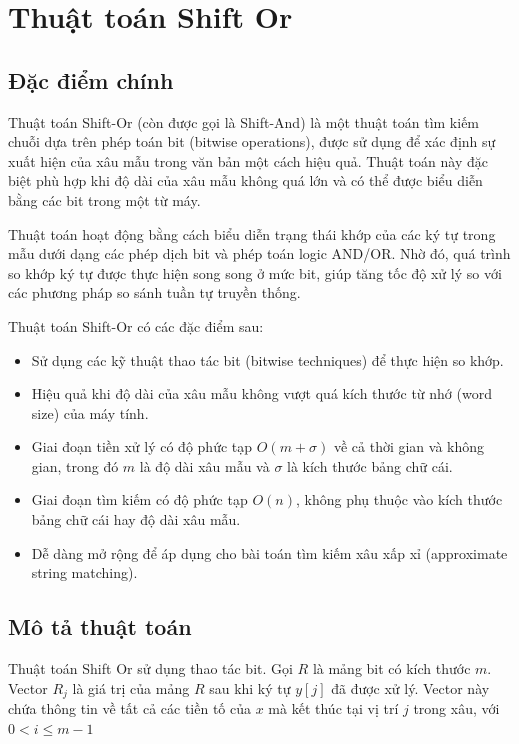 \section{Thuật toán Shift Or}

\subsection{Đặc điểm chính}

Thuật toán Shift-Or (còn được gọi là Shift-And) là một thuật toán tìm kiếm chuỗi dựa trên phép toán bit (bitwise operations), được sử dụng để xác định sự xuất hiện của xâu mẫu trong văn bản một cách hiệu quả. Thuật toán này đặc biệt phù hợp khi độ dài của xâu mẫu không quá lớn và có thể được biểu diễn bằng các bit trong một từ máy.

Thuật toán hoạt động bằng cách biểu diễn trạng thái khớp của các ký tự trong mẫu dưới dạng các phép dịch bit và phép toán logic AND/OR. Nhờ đó, quá trình so khớp ký tự được thực hiện song song ở mức bit, giúp tăng tốc độ xử lý so với các phương pháp so sánh tuần tự truyền thống.

Thuật toán Shift-Or có các đặc điểm sau:

\begin{itemize}
    \item Sử dụng các kỹ thuật thao tác bit (bitwise techniques) để thực hiện so khớp.
    \item Hiệu quả khi độ dài của xâu mẫu không vượt quá kích thước từ nhớ (word size) của máy tính.
    \item Giai đoạn tiền xử lý có độ phức tạp $O(m + \sigma)$ về cả thời gian và không gian, trong đó $m$ là độ dài xâu mẫu và $\sigma$ là kích thước bảng chữ cái.
    \item Giai đoạn tìm kiếm có độ phức tạp $O(n)$, không phụ thuộc vào kích thước bảng chữ cái hay độ dài xâu mẫu.
    \item Dễ dàng mở rộng để áp dụng cho bài toán tìm kiếm xâu xấp xỉ (approximate string matching).
\end{itemize}

\subsection{Mô tả thuật toán}

Thuật toán Shift Or sử dụng thao tác bit. Gọi $R$ là mảng bit có kích thước $m$. Vector $R_j$ là giá trị của mảng $R$ sau khi ký tự $y[j]$ đã được xử lý. Vector này chứa thông tin về tất cả các tiền tố của $x$ mà kết thúc tại vị trí $j$ trong xâu, với $0 <i\leq m - 1$


